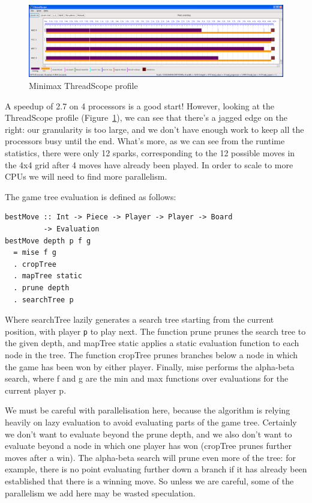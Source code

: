 \documentclass[twocolumn,9pt]{sigplanconf}
\newcommand{\codef}[1]{{\fontfamily{cmss}\small#1}}
\begin{document}
\begin{figure}
\begin{center}
\includegraphics[scale=0.3]{minimax1.png}
\end{center}
\caption{Minimax ThreadScope profile}
\label{f:minimax-threadscope1}
\end{figure}

A speedup of 2.7 on 4 processors is a good start!  However, looking at
the ThreadScope profile (Figure~\ref{f:minimax-threadscope1}), we can
see that there's a jagged edge on the right: our granularity is too
large, and we don't have enough work to keep all the processors busy
until the end.  What's more, as we can see from the runtime
statistics, there were only 12 sparks, corresponding to the 12
possible moves in the 4x4 grid after 4 moves have already been played.
In order to scale to more CPUs we will need to find more parallelism.

The game tree evaluation is defined as follows:

\begin{lstlisting}
bestMove :: Int -> Piece -> Player -> Player -> Board
         -> Evaluation
bestMove depth p f g 
  = mise f g 
  . cropTree
  . mapTree static
  . prune depth
  . searchTree p
\end{lstlisting}

Where \codef{searchTree} lazily generates a search tree starting
from the current position, with player \texttt{p} to play next.  The
function \codef{prune} prunes the search tree to the given depth, and
\codef{mapTree static} applies a static evaluation function to each
node in the tree.  The function \codef{cropTree} prunes branches below
a node in which the game has been won by either player.  Finally,
\codef{mise} performs the alpha-beta search, where \codef{f} and
\codef{g} are the min and max functions over evaluations for the
current player \codef{p}.

We must be careful with parallelisation here, because the algorithm is
relying heavily on lazy evaluation to avoid evaluating parts of the
game tree.  Certainly we don't want to evaluate beyond the prune
depth, and we also don't want to evaluate beyond a node in which one
player has won (\codef{cropTree} prunes further moves after a win).
The alpha-beta search will prune even more of the tree: for example,
there is no point evaluating further down a branch if it has already
been established that there is a winning move.  So unless we are
careful, some of the parallelism we add here may be wasted
speculation.
\end{document}
